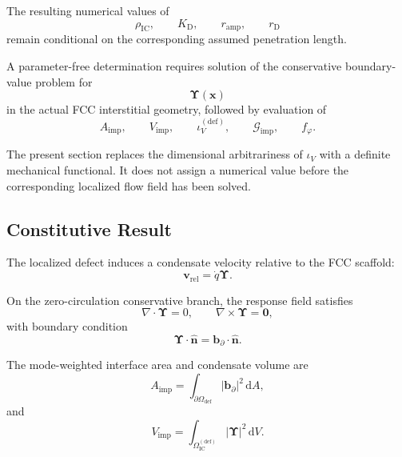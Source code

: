 The resulting numerical values of
\begin{equation}
    \rho_{\mathrm{IC}}, \qquad K_{\mathrm{D}}, \qquad r_{\mathrm{amp}}, \qquad r_{\mathrm{D}}
\end{equation}
remain conditional on the corresponding assumed penetration length.

A parameter-free determination requires solution of the conservative boundary-value problem for
\begin{equation}
    \boldsymbol{\Upsilon}(\mathbf{x})
\end{equation}
in the actual FCC interstitial geometry, followed by evaluation of
\begin{equation}
    A_{\mathrm{imp}}, \qquad V_{\mathrm{imp}}, \qquad \iota_V^{(\mathrm{def})}, \qquad \mathcal{G}_{\mathrm{imp}}, \qquad f_{\varphi}.
\end{equation}

The present section replaces the dimensional arbitrariness of $\iota_V$ with a definite mechanical functional. It does not assign a numerical value before the corresponding localized flow field has been solved.

\subsection{Constitutive Result}

The localized defect induces a condensate velocity relative to the FCC scaffold:
\begin{equation}
    \boxed{ \mathbf{v}_{\mathrm{rel}} = \dot{q} \boldsymbol{\Upsilon} }.
\end{equation}

On the zero-circulation conservative branch, the response field satisfies
\begin{equation}
    \boxed{ \nabla\cdot\boldsymbol{\Upsilon} = 0, \qquad \nabla\times\boldsymbol{\Upsilon} = \mathbf{0} },
\end{equation}
with boundary condition
\begin{equation}
    \boxed{ \boldsymbol{\Upsilon}\cdot\hat{\mathbf{n}} = \mathbf{b}_{\partial}\cdot\hat{\mathbf{n}} }.
\end{equation}

The mode-weighted interface area and condensate volume are
\begin{equation}
    \boxed{ A_{\mathrm{imp}} = \int_{\partial\Omega_{\mathrm{def}}} \left| \mathbf{b}_{\partial} \right|^2 \, \mathrm{d}A },
\end{equation}
and
\begin{equation}
    \boxed{ V_{\mathrm{imp}} = \int_{\Omega_{\mathrm{IC}}^{(\mathrm{def})}} \left| \boldsymbol{\Upsilon} \right|^2 \, \mathrm{d}V }.
\end{equation}

